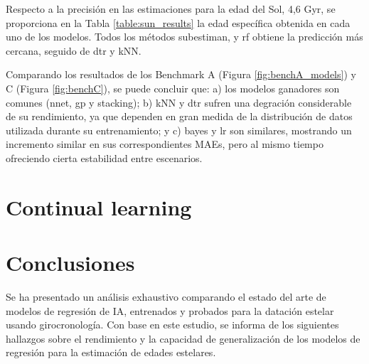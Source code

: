 Respecto a la precisión en las estimaciones para la edad del Sol, 4,6 Gyr, se proporciona en la Tabla \ref{table:sun_results} la edad específica obtenida en cada uno de los modelos. Todos los métodos subestiman, y rf obtiene la predicción más cercana, seguido de dtr y kNN.


\begin{table}
\centering
{}%
\caption{Edad estimada para el Sol en Gyr. El método más preciso es rf. }\label{table:sun_results}
\end{table}

Comparando los resultados de los Benchmark A (Figura \ref{fig:benchA_models}) y C (Figura \ref{fig:benchC}), se puede concluir que: a) los modelos ganadores son comunes (nnet, gp y stacking); b) kNN y dtr sufren una degración considerable de su rendimiento, ya que dependen en gran medida de la distribución de datos utilizada durante su entrenamiento; y c) bayes y lr son similares, mostrando un incremento similar en sus correspondientes MAEs, pero al mismo tiempo ofreciendo cierta estabilidad entre escenarios.


\chapter{Continual learning} 

\chapter{Conclusiones}

Se ha presentado un análisis exhaustivo comparando el estado del arte de modelos de regresión de IA, entrenados y probados para la datación estelar usando girocronología. Con base en este estudio, se informa de los siguientes hallazgos sobre el rendimiento y la capacidad de generalización de los modelos de regresión para la estimación de edades estelares.

